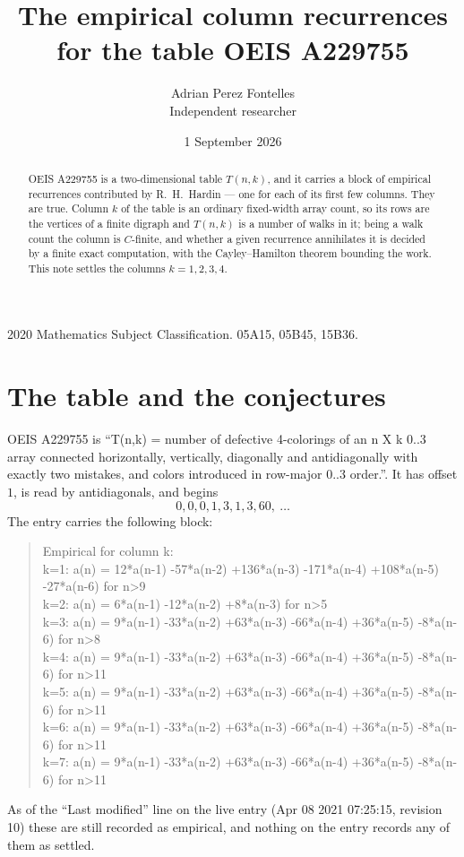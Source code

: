 \documentclass[11pt,a4paper]{article}
\title{The empirical column recurrences for the table OEIS A229755}
\author{Adrian Perez Fontelles\\ \small Independent researcher}
\date{1 September 2026}
\theoremstyle{plain}
\theoremstyle{definition}
\begin{document}
\maketitle

\begin{abstract}
OEIS A229755 is a two-dimensional table $T(n,k)$, and it carries a block of empirical
recurrences contributed by R.~H.~Hardin --- one for each of its first few columns. They are
true. Column $k$ of the table is an ordinary fixed-width array count, so its rows are the
vertices of a finite digraph and $T(n,k)$ is a number of walks in it; being a walk count the
column is $C$-finite, and whether a given recurrence annihilates it is decided by a finite
exact computation, with the Cayley--Hamilton theorem bounding the work. This note settles the columns $k=1, 2, 3, 4$.
\end{abstract}

\noindent\small 2020 Mathematics Subject Classification. 05A15, 05B45, 15B36.\normalsize

\section{The table and the conjectures}

OEIS A229755 is ``T(n,k) = number of defective 4-colorings of an n X k 0..3 array connected horizontally, vertically, diagonally and antidiagonally with exactly two mistakes, and colors introduced in row-major 0..3 order.''. It has offset $1$, is
read by antidiagonals, and begins
\[
0, 0, 0, 1, 3, 1, 3, 60,\ \dots
\]
The entry carries the following block:
\begin{quote}\small
Empirical for column k:\\
k=1: a(n) = 12*a(n-1) -57*a(n-2) +136*a(n-3) -171*a(n-4) +108*a(n-5) -27*a(n-6) for n>9\\
k=2: a(n) = 6*a(n-1) -12*a(n-2) +8*a(n-3) for n>5\\
k=3: a(n) = 9*a(n-1) -33*a(n-2) +63*a(n-3) -66*a(n-4) +36*a(n-5) -8*a(n-6) for n>8\\
k=4: a(n) = 9*a(n-1) -33*a(n-2) +63*a(n-3) -66*a(n-4) +36*a(n-5) -8*a(n-6) for n>11\\
k=5: a(n) = 9*a(n-1) -33*a(n-2) +63*a(n-3) -66*a(n-4) +36*a(n-5) -8*a(n-6) for n>11\\
k=6: a(n) = 9*a(n-1) -33*a(n-2) +63*a(n-3) -66*a(n-4) +36*a(n-5) -8*a(n-6) for n>11\\
k=7: a(n) = 9*a(n-1) -33*a(n-2) +63*a(n-3) -66*a(n-4) +36*a(n-5) -8*a(n-6) for n>11\\
\end{quote}
As of the ``Last modified'' line on the live entry (Apr 08 2021 07:25:15, revision 10) these are still
recorded as empirical, and nothing on the entry records any of them as settled.
\end{document}
